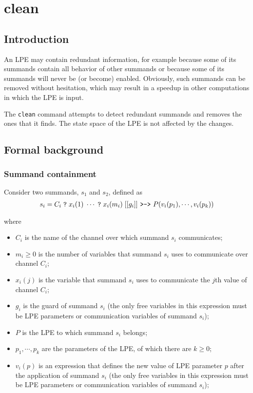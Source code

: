 \chapter{clean}

\section{Introduction}

An LPE may contain redundant information, for example because some of its summands contain all behavior of other summands or because some of its summands will never be (or become) enabled.
Obviously, such summands can be removed without hesitation, which may result in a speedup in other computations in which the LPE is input.

The \texttt{clean} command attempts to detect redundant summands and removes the ones that it finds.
The state space of the LPE is not affected by the changes.

\section{Formal background}

\subsection{Summand containment}

Consider two summands, $s_1$ and $s_2$, defined as
\begin{align*}
s_i = C_i \; \texttt{?} \; x_i(1) \; \cdots{} \; \texttt{?} \; x_i(m_i) \; [[g_i]] \text{ \texttt{>->} } P(v_i(p_1), \cdots{}, v_i(p_k))
\end{align*}

where

\begin{itemize}
\item $C_i$ is the name of the channel over which summand $s_i$ communicates;
\item $m_i \geq 0$ is the number of variables that summand $s_i$ uses to communicate over channel $C_i$;
\item $x_i(j)$ is the variable that summand $s_i$ uses to communicate the $j$th value of channel $C_i$;
\item $g_i$ is the guard of summand $s_i$ (the only free variables in this expression must be LPE parameters or communication variables of summand $s_i$);
\item $P$ is the LPE to which summand $s_i$ belongs;
\item $p_1, \cdots{}, p_k$ are the parameters of the LPE, of which there are $k \geq 0$;
\item $v_i(p)$ is an expression that defines the new value of LPE parameter $p$ after the application of summand $s_i$ (the only free variables in this expression must be LPE parameters or communication variables of summand $s_i$);
\end{itemize}

